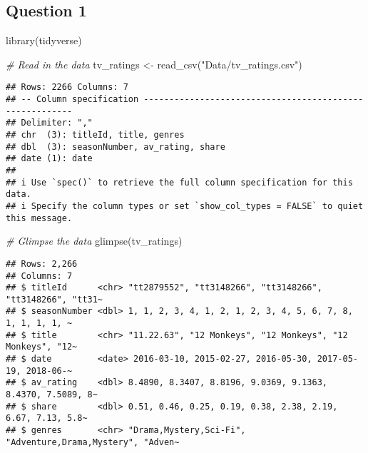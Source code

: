 \documentclass[
]{article}
\newenvironment{Shaded}{\begin{snugshade}}{\end{snugshade}}
\newcommand{\CommentTok}[1]{\textcolor[rgb]{0.56,0.35,0.01}{\textit{#1}}}
\newcommand{\FunctionTok}[1]{\textcolor[rgb]{0.00,0.00,0.00}{#1}}
\newcommand{\NormalTok}[1]{#1}
\newcommand{\OtherTok}[1]{\textcolor[rgb]{0.56,0.35,0.01}{#1}}
\newcommand{\StringTok}[1]{\textcolor[rgb]{0.31,0.60,0.02}{#1}}
\begin{document}
\hypertarget{question-1-1}{%
\subsection{Question 1}\label{question-1-1}}

\begin{Shaded}
\begin{Highlighting}[]
\FunctionTok{library}\NormalTok{(tidyverse)}

\CommentTok{\# Read in the data }
\NormalTok{tv\_ratings }\OtherTok{\textless{}{-}} \FunctionTok{read\_csv}\NormalTok{(}\StringTok{"Data/tv\_ratings.csv"}\NormalTok{)}
\end{Highlighting}
\end{Shaded}

\begin{verbatim}
## Rows: 2266 Columns: 7
## -- Column specification --------------------------------------------------------
## Delimiter: ","
## chr  (3): titleId, title, genres
## dbl  (3): seasonNumber, av_rating, share
## date (1): date
## 
## i Use `spec()` to retrieve the full column specification for this data.
## i Specify the column types or set `show_col_types = FALSE` to quiet this message.
\end{verbatim}

\begin{Shaded}
\begin{Highlighting}[]
\CommentTok{\# Glimpse the data }
\FunctionTok{glimpse}\NormalTok{(tv\_ratings)}
\end{Highlighting}
\end{Shaded}

\begin{verbatim}
## Rows: 2,266
## Columns: 7
## $ titleId      <chr> "tt2879552", "tt3148266", "tt3148266", "tt3148266", "tt31~
## $ seasonNumber <dbl> 1, 1, 2, 3, 4, 1, 2, 1, 2, 3, 4, 5, 6, 7, 8, 1, 1, 1, 1, ~
## $ title        <chr> "11.22.63", "12 Monkeys", "12 Monkeys", "12 Monkeys", "12~
## $ date         <date> 2016-03-10, 2015-02-27, 2016-05-30, 2017-05-19, 2018-06-~
## $ av_rating    <dbl> 8.4890, 8.3407, 8.8196, 9.0369, 9.1363, 8.4370, 7.5089, 8~
## $ share        <dbl> 0.51, 0.46, 0.25, 0.19, 0.38, 2.38, 2.19, 6.67, 7.13, 5.8~
## $ genres       <chr> "Drama,Mystery,Sci-Fi", "Adventure,Drama,Mystery", "Adven~
\end{verbatim}
\end{document}
